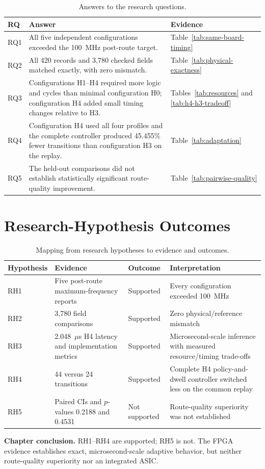 \begin{table}[H]
\centering
\footnotesize
\caption{Answers to the research questions.}
\label{tab:rq-answers}
\begin{tabularx}{\textwidth}{@{}p{}X p{}@{}}
\toprule
\textbf{RQ} & \textbf{Answer} & \textbf{Evidence}\\
\midrule
RQ1 & All five independent configurations exceeded the 100~MHz post-route target. &
Table~\ref{tab:same-board-timing}\\
RQ2 & All 420 records and 3,780 checked fields matched exactly, with zero mismatch. &
Table~\ref{tab:physical-exactness}\\
RQ3 & Configurations H1--H4 required more logic and cycles than minimal configuration
H0; configuration H4 added small timing changes relative to H3. &
Tables~\ref{tab:resources} and \ref{tab:h4-h3-tradeoff}\\
RQ4 & Configuration H4 used all four profiles and the complete controller produced
45.455\% fewer transitions than configuration H3 on the replay. &
Table~\ref{tab:adaptation}\\
RQ5 & The held-out comparisons did not establish statistically significant
route-quality improvement. & Table~\ref{tab:pairwise-quality}\\
\bottomrule
\end{tabularx}
\end{table}

\section{Research-Hypothesis Outcomes}

\begin{table}[H]
\centering
\footnotesize
\caption{Mapping from research hypotheses to evidence and outcomes.}
\label{tab:hypothesis-outcomes}
\begin{tabularx}{\textwidth}{@{}p{}p{}p{}X@{}}
\toprule
\textbf{Hypothesis} & \textbf{Evidence} & \textbf{Outcome} &
\textbf{Interpretation}\\
\midrule
RH1 & Five post-route maximum-frequency reports & Supported & Every configuration
exceeded 100~MHz\\
RH2 & 3,780 field comparisons & Supported & Zero physical/reference mismatch\\
RH3 & 2.048~$\mu$s H4 latency and implementation metrics & Supported &
Microsecond-scale inference with measured resource/timing trade-offs\\
RH4 & 44 versus 24 transitions & Supported & Complete H4 policy-and-dwell controller
switched less on the common replay\\
RH5 & Paired CIs and $p$-values 0.2188 and 0.4531 & Not supported & Route-quality
superiority was not established\\
\bottomrule
\end{tabularx}
\end{table}

{\small\textbf{Chapter conclusion.} RH1--RH4 are supported; RH5 is not. The FPGA
evidence establishes exact, microsecond-scale adaptive behavior, but neither
route-quality superiority nor an integrated ASIC.\par}
